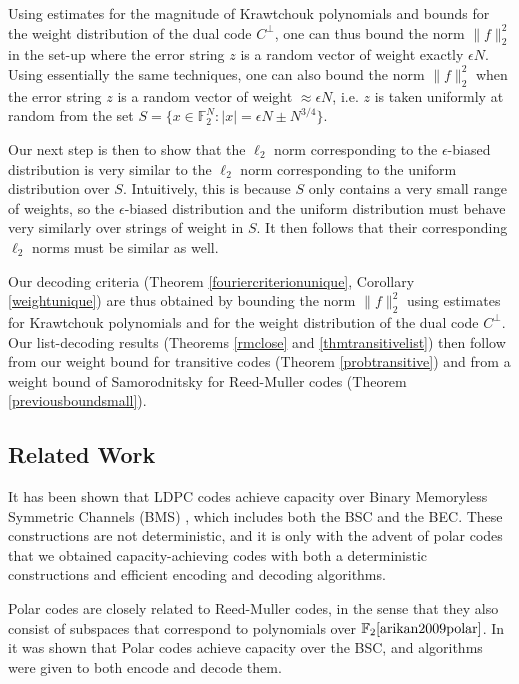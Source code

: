 \documentclass[12pt]{article}
\newcommand{\F}{\mathbb{F}}
\begin{document}
Using estimates for the magnitude of Krawtchouk polynomials and bounds for the weight distribution of the dual code $C^\perp$, one can thus bound the norm $\|f\|_2^2$ in the set-up where the error string $z$ is a random vector of weight exactly $\epsilon N$. Using essentially the same techniques, one can also bound the norm $\|f\|_2^2$ when the error string $z$ is a random vector of weight $\approx\epsilon N$, i.e. $z$ is taken uniformly at random from the set $S=\{x\in\F_2^N:|x|=\epsilon N\pm N^{3/4}\}$.

Our next step is then to show that the $\ell_2$ norm corresponding to the $\epsilon$-biased distribution is very similar to the $\ell_2$ norm corresponding to the uniform distribution over $S$. Intuitively, this is because $S$ only contains a very small range of weights, so the $\epsilon$-biased distribution and the uniform distribution must behave very similarly over strings of weight in $S$.
It then follows that their corresponding $\ell_2$ norms must be similar as well.  

Our decoding criteria (Theorem \ref{fouriercriterionunique}, Corollary \ref{weightunique}) are thus obtained by bounding the norm $\|f\|_2^2$ using estimates for Krawtchouk polynomials and for the weight distribution of the dual code $C^\perp$. Our list-decoding results (Theorems \ref{rmclose} and \ref{thmtransitivelist}) then follow from our weight bound for transitive codes (Theorem \ref{probtransitive}) and from a weight bound of Samorodnitsky for Reed-Muller codes (Theorem \ref{previousboundsmall}).

\subsection{Related Work}
It has been shown that LDPC codes achieve capacity over  Binary Memoryless Symmetric Channels (BMS) \cite{luby1997ldpc2,kudekar2013ldpc,gallager1962ldpc}, which
includes both the BSC and the BEC. These constructions are not deterministic, and it is only with the advent of polar codes \cite{arikan2009polar} that we obtained  capacity-achieving codes with both a deterministic constructions and efficient encoding and decoding algorithms.

Polar codes are closely related to Reed-Muller codes, in the sense that they also consist of subspaces that correspond to polynomials over $\F_2 \cite{arikan2009polar}$. In \cite{arikan2009polar} it was shown that Polar codes achieve capacity over the BSC, and algorithms were given to both encode and decode them.
\end{document}
